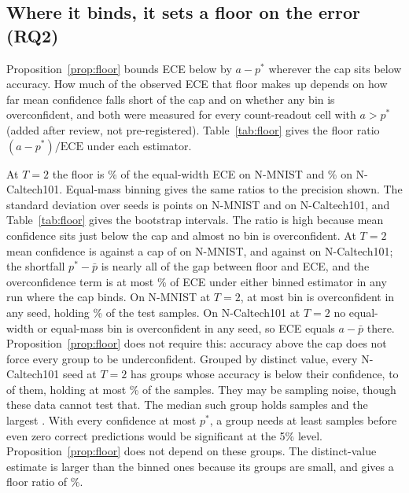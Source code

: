 \documentclass[10pt]{article}
\begin{document}
\subsection{Where it binds, it sets a floor on the error (RQ2)}
\label{sec:explains}

Proposition~\ref{prop:floor} bounds ECE below by $a-p^{*}$ wherever the cap sits below accuracy.
How much of the observed ECE that floor makes up depends on how far mean confidence falls short of
the cap and on whether any bin is overconfident, and both were measured for every count-readout
cell with $a>p^{*}$ (added after review, not pre-registered). Table~\ref{tab:floor} gives the floor ratio $(a-p^{*})/\mathrm{ECE}$ under each
estimator.

At $T=2$ the floor is \frNmTwoW\% of the equal-width ECE on N-MNIST and \frNcTwoW\% on %
N-Caltech101. Equal-mass binning gives the same ratios to the precision shown. The standard
deviation over seeds is \frNmTwoWSd{} points on N-MNIST and \frNcTwoWSd{} on %
N-Caltech101, and Table~\ref{tab:floor} gives the bootstrap intervals.
The ratio is high because mean confidence sits just below the cap and almost no bin is
overconfident. At $T=2$ mean confidence is \pbarNmTwo{} against a cap of \ceilTenTwo{} on N-MNIST, %
and \pbarNcTwo{} against \ceilHundredOneTwo{} on N-Caltech101; the shortfall $p^{*}-\bar p$ is %
nearly all of the gap between floor and ECE, and the overconfidence term is at most %
\overShareMax\% of ECE under either binned estimator in any run where the cap binds. On N-MNIST at $T=2$, at most \overNmTwoMaxBins{} bin is overconfident %
in any seed, holding \overNmTwoShare\% of the test samples. On N-Caltech101 at $T=2$ no
equal-width or equal-mass bin is overconfident in any seed, so ECE equals $a-\bar p$ there.
Proposition~\ref{prop:floor} does not require this: accuracy above the cap does not force every
group to be underconfident. Grouped by distinct value, every N-Caltech101 seed at $T=2$ has
groups whose accuracy is below their confidence, \overNcTwoDistinctMin{} to %
\overNcTwoDistinctMax{} of them, holding at most \overNcTwoDistinctShare\% of the samples. They %
may be sampling noise, though these data cannot test that. The median such group holds %
\overNcTwoMedianSize{} samples and the largest \overNcTwoMaxSize. With every confidence at most %
$p^{*}$, a group needs at least \overNcTwoSigN{} samples before even zero correct predictions %
would be significant at the 5\% level. Proposition~\ref{prop:floor} does not depend on these
groups. The distinct-value estimate is larger than the binned ones because its groups are
small, and gives a floor ratio of \frNcTwoD\%.
\end{document}
